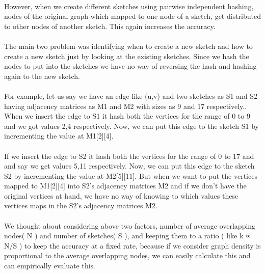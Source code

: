 \documentclass[12pt]{report}
\numberwithin{figure}{section}
\numberwithin{table}{section}
\begin{document}
\paragraph{}

 However, when we create different sketches using pairwise independent hashing,  nodes of the original graph which mapped to one node of a sketch, get distributed to other nodes of another sketch. This again increases the accuracy. 

\paragraph{}

The main two problem was identifying when to create a new sketch and how to create a new sketch just by looking at the existing sketches. Since we hash the nodes to put into the sketches we have no way of reversing the hash and hashing again to the new sketch.

\paragraph{}

For example, let us say we have an edge like (u,v) and two sketches as S1 and S2 having adjacency matrices as M1 and M2 with sizes as 9 and 17 respectively.. When we insert the edge to S1 it hash both the vertices for the range of 0 to 9 and we got values 2,4 respectively. Now, we can put this edge to the sketch S1  by incrementing the value at M1[2][4]. 

\paragraph{}

If we insert the edge to S2 it hash both the vertices for the range of 0 to 17 and and say we get values 5,11 respectively. Now, we can put this edge to the sketch S2  by incrementing the value at M2[5][11]. But when we want to put the vertices mapped to M1[2][4] into S2’s adjacency matrices M2 and if we don’t have the original vertices at hand, we have no way of knowing  to which values these vertices maps in the S2’s adjacency matrices M2.

\paragraph{}

We thought about considering above two factors, number of average overlapping nodes( N ) and number of sketches( S ), and keeping them to a ratio ( like  k  ∝ N/S ) to keep the accuracy at a fixed rate, because if we consider graph density is proportional to the average overlapping nodes, we can easily calculate this and can empirically evaluate this.
\end{document}
